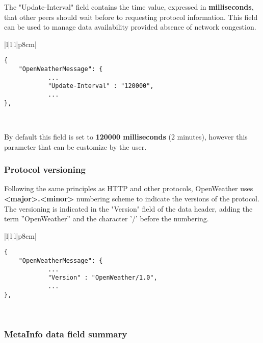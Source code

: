 The "Update-Interval" field contains the time value, expressed in \textbf{milliseconds}, that other peers should wait before to requesting protocol information. This field can be used to manage data availability provided absence of network congestion.

\begin{table}[H]
\centering
\begin{tabular}{|l|l|l|p{8cm}|}
\hline
\begin{minipage}[t]{\linewidth}
	\begin{verbatim}
{
    "OpenWeatherMessage": {
            ...
            "Update-Interval" : "120000",
            ...
},
      \end{verbatim}
\end{minipage} \\
\hline
\end{tabular}
\caption{Update-Interval field in a data messages of OpenWeather protocol.}
\end{table}

By default this field is set to \textbf{120000 milliseconds} (2 minutes), however this parameter that can be customize by the user.

\subsubsection{Protocol versioning}

Following the same principles as \gls{HTTP} and other protocols, OpenWeather uses \textbf{<major>.<minor>} numbering scheme to indicate the versions of the protocol. The versioning is indicated in the "Version" field of the data header, adding the term ''OpenWeather''  and the character '/' before the numbering. 

\begin{table}[H]
\centering
\begin{tabular}{|l|l|l|p{8cm}|}
\hline
\begin{minipage}[t]{\linewidth}
	\begin{verbatim}
{
    "OpenWeatherMessage": {
            ...
            "Version" : "OpenWeather/1.0",
            ...
},
      \end{verbatim}
\end{minipage} \\
\hline
\end{tabular}
\caption{Version field in a data message of OpenWeather.}
\end{table}

\subsubsection{MetaInfo data field summary}

